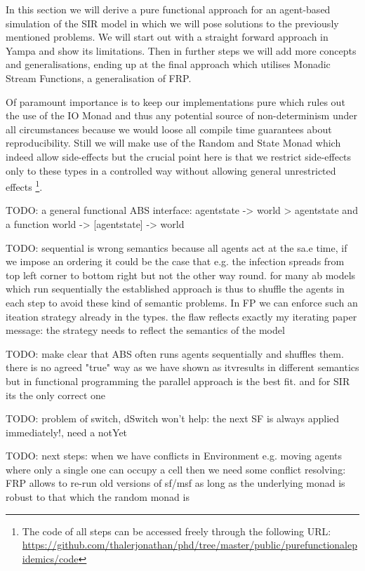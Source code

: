 In this section we will derive a pure functional approach for an agent-based simulation of the SIR model in which we will pose solutions to the previously mentioned problems. We will start out with a straight forward approach in Yampa and show its limitations. Then in further steps we will add more concepts and generalisations, ending up at the final approach which utilises Monadic Stream Functions, a generalisation of FRP.

Of paramount importance is to keep our implementations pure which rules out the use of the IO Monad and thus any potential source of non-determinism under all circumstances because we would loose all compile time guarantees about reproducibility. Still we will make use of the Random and State Monad which indeed allow side-effects but the crucial point here is that we restrict side-effects only to these types in a controlled way without allowing general unrestricted effects
\footnote{The code of all steps can be accessed freely through the following URL: \url{https://github.com/thalerjonathan/phd/tree/master/public/purefunctionalepidemics/code}}.

TODO: a general functional ABS interface: agentstate -> world > agentstate and a function world -> [agentstate] -> world

TODO: sequential is wrong semantics because all agents act at the sa.e time, if we impose an ordering it could be the case that e.g. the infection spreads from top left corner to bottom right but not the other way round. for many ab models which run sequentially the established approach is thus to shuffle the agents in each step to avoid these kind of semantic problems. In FP we can enforce such an iteation strategy already in the types. the flaw reflects exactly my iterating paper message: the strategy needs to reflect the semantics of the model

TODO: make clear that ABS often runs agents sequentially and shuffles them. there is no agreed "true" way as we have shown as itvresults in different semantics but in  functional programming the parallel approach is the best fit. and for SIR its the only correct one

TODO: problem of switch, dSwitch won't help: the next SF is always applied immediately!, need a notYet

TODO: next steps: when we have conflicts in Environment e.g. moving agents where only a single one can occupy a cell then we need some conflict resolving: FRP allows to re-run old versions of sf/msf as long as the underlying monad is robust to that which the random monad is

